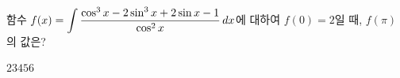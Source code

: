 함수 $f(x)=\displaystyle\int \dfrac{\cos^3 x-2\sin^3 x+2\sin x-1}{\cos^2 x}\mkern3mu dx$에 대하여 $f(0)=2$일 때, $f(\pi)$의 값은?
\begin{choices32}{$2$}{$3$}{$4$}{$5$}{$6$}\end{choices32}
